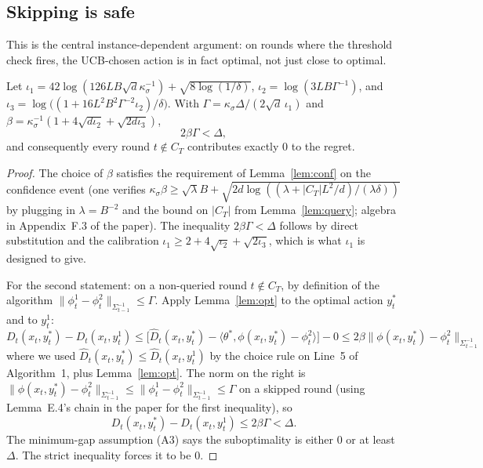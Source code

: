 \documentclass[11pt]{article}
\begin{document}
\subsection{Skipping is safe}

This is the central instance-dependent argument: on rounds where the threshold check fires, the UCB-chosen action is in fact optimal, not just close to optimal.

\begin{lemma}
\label{lem:safe}
Let $\iota_1 = 42 \log(126 L B \sqrt{d} \kappa_\sigma^{-1}) + \sqrt{8 \log(1/\delta)}$, $\iota_2 = \log(3 L B \Gamma^{-1})$, and $\iota_3 = \log\bigl((1 + 16 L^2 B^2 \Gamma^{-2} \iota_2)/\delta\bigr)$. With $\Gamma = \kappa_\sigma \Delta/(2\sqrt{d}\,\iota_1)$ and $\beta = \kappa_\sigma^{-1}(1 + 4\sqrt{d \iota_2} + \sqrt{2 d \iota_3})$,
\[
  2 \beta \Gamma < \Delta,
\]
and consequently every round $t \notin C_T$ contributes exactly $0$ to the regret.
\end{lemma}

\begin{proof}
The choice of $\beta$ satisfies the requirement of Lemma~\ref{lem:conf} on the confidence event (one verifies $\kappa_\sigma \beta \ge \sqrt{\lambda} B + \sqrt{2 d \log((\lambda + |C_T| L^2/d)/(\lambda \delta))}$ by plugging in $\lambda = B^{-2}$ and the bound on $|C_T|$ from Lemma~\ref{lem:query}; algebra in Appendix~F.3 of the paper). The inequality $2\beta\Gamma < \Delta$ follows by direct substitution and the calibration $\iota_1 \ge 2 + 4\sqrt{\iota_2} + \sqrt{2 \iota_3}$, which is what $\iota_1$ is designed to give.

For the second statement: on a non-queried round $t \notin C_T$, by definition of the algorithm $\|\phi_t^1 - \phi_t^2\|_{\Sigma_{t-1}^{-1}} \le \Gamma$. Apply Lemma~\ref{lem:opt} to the optimal action $y_t^*$ and to $y_t^1$:
\[
  D_t(x_t, y_t^*) - D_t(x_t, y_t^1)
  \le \bigl[\hat D_t(x_t, y_t^*) - \langle \theta^*, \phi(x_t, y_t^*) - \phi_t^2 \rangle\bigr]
    - 0
  \le 2 \beta \|\phi(x_t, y_t^*) - \phi_t^2\|_{\Sigma_{t-1}^{-1}}
\]
where we used $\hat D_t(x_t, y_t^*) \le \hat D_t(x_t, y_t^1)$ by the choice rule on Line~5 of Algorithm~1, plus Lemma~\ref{lem:opt}. The norm on the right is $\|\phi(x_t, y_t^*) - \phi_t^2\|_{\Sigma_{t-1}^{-1}} \le \|\phi_t^1 - \phi_t^2\|_{\Sigma_{t-1}^{-1}} \le \Gamma$ on a skipped round (using Lemma~E.4's chain in the paper for the first inequality), so
\[
  D_t(x_t, y_t^*) - D_t(x_t, y_t^1) \le 2 \beta \Gamma < \Delta.
\]
The minimum-gap assumption (A3) says the suboptimality is either $0$ or at least $\Delta$. The strict inequality forces it to be $0$.
\end{proof}
\end{document}

